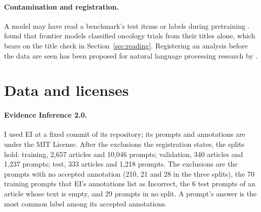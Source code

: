 \documentclass[11pt,letterpaper]{article}
\begin{document}
\paragraph{Contamination and registration.} A model may have read a benchmark's test items or labels during pretraining \citep{sainz2023}. \citet{windisch2026} found that frontier models classified oncology trials from their titles alone, which bears on the title check in Section~\ref{sec:reading}. Registering an analysis before the data are seen has been proposed for natural language processing research by \citet{vanmiltenburg2021}.

\section{Data and licenses}
\label{sec:data}

\paragraph{Evidence Inference 2.0.} I used EI at a fixed commit of its repository; its prompts and annotations are under the MIT License. After the exclusions the registration states, the splits hold: training, 2,657 articles and 10,046 prompts; validation, 340 articles and 1,237 prompts; test, 333 articles and 1,218 prompts. The exclusions are the prompts with no accepted annotation (210, 21 and 28 in the three splits), the 70 training prompts that EI's annotations list as Incorrect, the 6 test prompts of an article whose text is empty, and 29 prompts in no split. A prompt's answer is the most common label among its accepted annotations.
\end{document}
